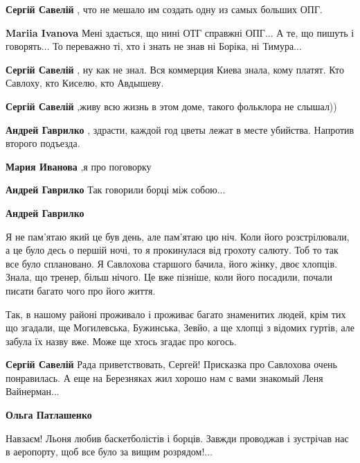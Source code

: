 \begin{itemize}
\begin{itemize}
\begin{itemize} %
\textbf{Сергій Савелій} , что не мешало им создать одну из самых больших ОПГ.

\textbf{Mariia Ivanova} Мені здається, що нині ОТГ справжні ОПГ... А те, що пишуть і говорять... То переважно ті, хто і знать не знав ні Боріка, ні Тимура...

\textbf{Сергій Савелій} , ну как не знал. Вся коммерция Киева знала, кому платят. Кто Савлоху, кто Киселю, кто Авдышеву.
\end{itemize} %

\textbf{Сергій Савелій} ,живу всю жизнь в этом доме, такого фольклора не слышал))

\begin{itemize} %
\textbf{Андрей Гаврилко} , здрасти, каждой год цветы лежат в месте убийства. Напротив второго подъезда.

\textbf{Мария Иванова} ,я про поговорку

\textbf{Андрей Гаврилко} Так говорили борці між собою...

\textbf{Андрей Гаврилко} 

Я не пам'ятаю який це був день, але пам'ятаю цю ніч. Коли його розстрілювали, а це
було десь о першій ночі, то я прокинулася від грохоту салюту. Тоб то так все
було сплановано. Я Савлохова старшого бачила, його жінку, двоє хлопців. Знала, що
тренер, більш нічого. Це вже пізніше, коли його посадили, почали писати багато чого
про його життя.

Так, в нашому районі проживало і проживає багато знаменитих людей, крім тих що
згадали, ще Могилевська, Бужинська, Зевйо, а ще хлопці з відомих гуртів, але забула
їх назву вже. Може ще хтось згадає про когось.
\end{itemize} %

\textbf{Сергій Савелій} Рада приветствовать, Сергей! Присказка про Савлохова очень понравилась.
А еще на Березняках жил хорошо нам с вами знакомый Леня Вайнерман...

\begin{itemize} %
\textbf{Ольга Патлашенко} 

Навзаєм! Льоня любив баскетболістів і борців. Завжди проводжав і зустрічав нас
в аеропорту, щоб все було за вищим розрядом!...

\end{itemize} %


\end{itemize}
\end{itemize}
